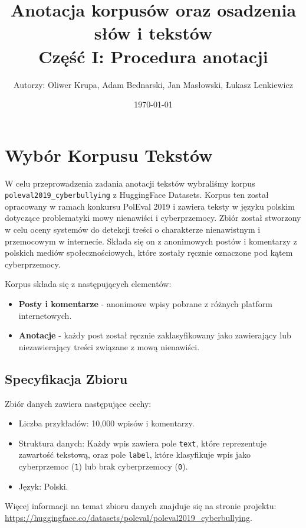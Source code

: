 \documentclass[12pt]{article}
\title{Anotacja korpusów oraz osadzenia słów i tekstów\\Część I: Procedura anotacji}
\author{Autorzy: Oliwer Krupa, Adam Bednarski, Jan Masłowski, Łukasz Lenkiewicz}
\date{\today}
\begin{document}
\maketitle
\newpage

\renewcommand{\contentsname}{Rozdziały}
\tableofcontents
\newpage

\section{Wybór Korpusu Tekstów}
W celu przeprowadzenia zadania anotacji tekstów wybraliśmy korpus \texttt{poleval2019\_cyberbullying} z HuggingFace Datasets. Korpus ten został opracowany w ramach konkursu PolEval 2019 i zawiera teksty w języku polskim dotyczące problematyki mowy nienawiści i cyberprzemocy. Zbiór został stworzony w celu oceny systemów do detekcji treści o charakterze nienawistnym i przemocowym w internecie. Składa się on z anonimowych postów i komentarzy z polskich mediów społecznościowych, które zostały ręcznie oznaczone pod kątem cyberprzemocy.

Korpus składa się z następujących elementów:
\begin{itemize}
    \item \textbf{Posty i komentarze} - anonimowe wpisy pobrane z różnych platform internetowych.
    \item \textbf{Anotacje} - każdy post został ręcznie zaklasyfikowany jako zawierający lub niezawierający treści związane z mową nienawiści.
\end{itemize}

\subsection{Specyfikacja Zbioru}
Zbiór danych zawiera następujące cechy:
\begin{itemize}
    \item Liczba przykładów: 10,000 wpisów i komentarzy.
    \item Struktura danych: Każdy wpis zawiera pole \texttt{text}, które reprezentuje zawartość tekstową, oraz pole \texttt{label}, które klasyfikuje wpis jako cyberprzemoc (\texttt{1}) lub brak cyberprzemocy (\texttt{0}).
    \item Język: Polski.
\end{itemize}

Więcej informacji na temat zbioru danych znajduje się na stronie projektu: \url{https://huggingface.co/datasets/poleval/poleval2019_cyberbullying}.
\end{document}
